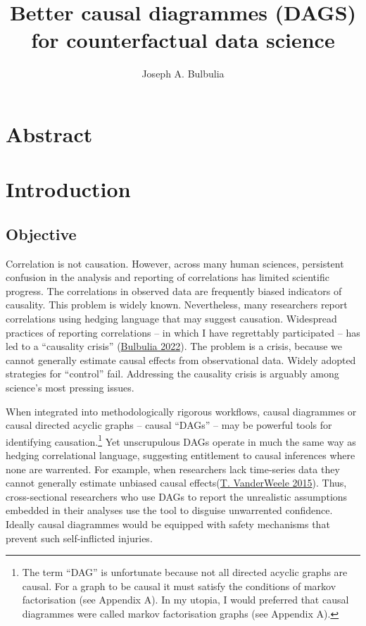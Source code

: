 \documentclass[
  singlecolumn]{report}
\title{Better causal diagrammes (DAGS) for counterfactual data science}
\author{Joseph A. Bulbulia}
\date{}
\begin{document}
\maketitle
\ifdefined\Shaded\renewenvironment{Shaded}{\begin{tcolorbox}[boxrule=0pt, enhanced, breakable, borderline west={3pt}{0pt}{shadecolor}, frame hidden, sharp corners, interior hidden]}{\end{tcolorbox}}\fi

\listoffigures
\listoftables
\hypertarget{abstract}{%
\section{Abstract}\label{abstract}}

\hypertarget{introduction}{%
\section{Introduction}\label{introduction}}

\hypertarget{objective}{%
\subsection{Objective}\label{objective}}

Correlation is not causation. However, across many human sciences,
persistent confusion in the analysis and reporting of correlations has
limited scientific progress. The correlations in observed data are
frequently biased indicators of causality. This problem is widely known.
Nevertheless, many researchers report correlations using hedging
language that may suggest causation. Widespread practices of reporting
correlations -- in which I have regrettably participated -- has led to a
``causality crisis'' (\protect\hyperlink{ref-bulbulia2022}{Bulbulia
2022}). The problem is a crisis, because we cannot generally estimate
causal effects from observational data. Widely adopted strategies for
``control'' fail. Addressing the causality crisis is arguably among
science's most pressing issues.

When integrated into methodologically rigorous workflows, causal
diagrammes or causal directed acyclic graphs -- causal ``DAGs'' -- may
be powerful tools for identifying causation.\footnote{The term ``DAG''
  is unfortunate because not all directed acyclic graphs are causal. For
  a graph to be causal it must satisfy the conditions of markov
  factorisation (see Appendix A). In my utopia, I would preferred that
  causal diagrammes were called markov factorisation graphs (see
  Appendix A).} Yet unscrupulous DAGs operate in much the same way as
hedging correlational language, suggesting entitlement to causal
inferences where none are warrented. For example, when researchers lack
time-series data they cannot generally estimate unbiased causal
effects(\protect\hyperlink{ref-vanderweele2015}{T. VanderWeele 2015}).
Thus, cross-sectional researchers who use DAGs to report the unrealistic
assumptions embedded in their analyses use the tool to disguise
unwarrented confidence. Ideally causal diagrammes would be equipped with
safety mechanisms that prevent such self-inflicted injuries.
\end{document}
